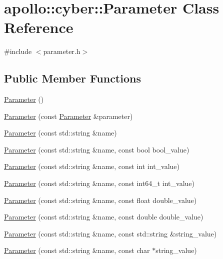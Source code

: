 \hypertarget{classapollo_1_1cyber_1_1Parameter}{\section{apollo\-:\-:cyber\-:\-:Parameter Class Reference}
\label{classapollo_1_1cyber_1_1Parameter}
}


{\ttfamily \#include $<$parameter.\-h$>$}

\subsection*{Public Member Functions}
\begin{DoxyCompactItemize}
\item 
\hyperlink{classapollo_1_1cyber_1_1Parameter_a821e2ddc98cc19c985d77e0371d74366}{Parameter} ()
\item 
\hyperlink{classapollo_1_1cyber_1_1Parameter_a626c40f9cd316a6a5dfc136596cd8083}{Parameter} (const \hyperlink{classapollo_1_1cyber_1_1Parameter}{Parameter} \&parameter)
\item 
\hyperlink{classapollo_1_1cyber_1_1Parameter_afb61538a8a543f979a5787e224c66f53}{Parameter} (const std\-::string \&name)
\item 
\hyperlink{classapollo_1_1cyber_1_1Parameter_a5ff93d70601bac8f4ff1a0092c88f75d}{Parameter} (const std\-::string \&name, const bool bool\-\_\-value)
\item 
\hyperlink{classapollo_1_1cyber_1_1Parameter_aa7b936546d672590f8cd662b1ef87912}{Parameter} (const std\-::string \&name, const int int\-\_\-value)
\item 
\hyperlink{classapollo_1_1cyber_1_1Parameter_a2ff0fddb34b46deff5ec701c8512eb7b}{Parameter} (const std\-::string \&name, const int64\-\_\-t int\-\_\-value)
\item 
\hyperlink{classapollo_1_1cyber_1_1Parameter_a41d7d10b81f88c468dcbbbbe2fb8bb37}{Parameter} (const std\-::string \&name, const float double\-\_\-value)
\item 
\hyperlink{classapollo_1_1cyber_1_1Parameter_a73ed7f1d7e933f6bfe851a2f1b939067}{Parameter} (const std\-::string \&name, const double double\-\_\-value)
\item 
\hyperlink{classapollo_1_1cyber_1_1Parameter_a9e25544df18fd111ce4f678cf8463a32}{Parameter} (const std\-::string \&name, const std\-::string \&string\-\_\-value)
\item 
\hyperlink{classapollo_1_1cyber_1_1Parameter_a11ebed14ade310567b4c150d713f964c}{Parameter} (const std\-::string \&name, const char $\ast$string\-\_\-value)

\end{DoxyCompactItemize}
